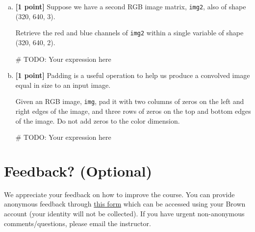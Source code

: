 \documentclass[11pt]{article}
\begin{document}
\begin{enumerate}[(a)]
    \pagebreak
    \item \textbf{[1 point]} Suppose we have a second RGB image matrix, \texttt{img2}, also of shape (320, 640, 3).
    
    \begin{tcolorbox}[colback=orange!5!white,colframe=orange!75!black]
    Retrieve the red and blue channels of \texttt{img2} within a single variable of shape (320, 640, 2).
    \end{tcolorbox}
    
    \begin{tcolorbox}[colback=white!5!white,colframe=green!75!black,height=2cm]
    \begin{python}
    # TODO: Your expression here
    \end{python}
    \end{tcolorbox}
    
    \item \textbf{[1 point]} Padding is a useful operation to help us produce a convolved image equal in size to an input image. 
    
    \begin{tcolorbox}[colback=orange!5!white,colframe=orange!75!black]
    Given an RGB image, \texttt{img}, pad it with two columns of zeros on the left and right edges of the image, and three rows of zeros on the top and bottom edges of the image. Do not add zeros to the color dimension.
    \end{tcolorbox}
    
    \begin{tcolorbox}[colback=white!5!white,colframe=green!75!black,height=2cm]
    \begin{python}
    # TODO: Your expression here
    \end{python}
    \end{tcolorbox}
    
\end{enumerate}


\pagebreak
\section*{Feedback? (Optional)}
We appreciate your feedback on how to improve the course. You can provide anonymous feedback through \href{https://forms.gle/cvFQKUTJELGQ9mNB6}{this form} which can be accessed using your Brown account (your identity will not be collected). If you have urgent non-anonymous comments/questions, please email the instructor. 
\end{document}

